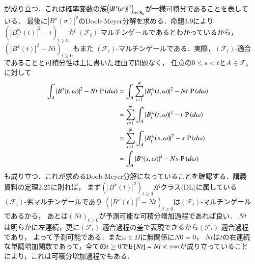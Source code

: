 \begin{prf}
\begin{description}
\begin{align}
		\end{align}
		が成り立つ．これは確率変数の族$\left(|B^x(\sigma)|^2\right)_{\sigma \in \bf{S}_a}$が一様可積分であることを表している．
		最後に$|B^x(\sigma)|^2$のDoob-Meyer分解を求める．命題3.9により$\left(|B_i^{x_i}(t)|^2 - t\right)_{t \geq 0}$が
		$(\mathcal{F}_t)$-マルチンゲールであるとわかっているから，$\left(|B^x(t)|^2 - Nt\right)_{t \geq 0}$もまた
		$(\mathcal{F}_t)$-マルチンゲールである．実際，$(\mathcal{F}_t)$-適合であることと可積分性は上に書いた理由で問題なく，
		任意の$0 \leq s < t$と$A \in \mathcal{F}_s$に対して
		\begin{align}
			\int_{A} |B^x(t, \omega)|^2 - Nt\, \operatorname{P} \left(d\omega\right) 
			&= \int_{A} \sum_{i=1}^{N} |B_i^{x_i}(t,\omega)|^2 - Nt\, \operatorname{P} \left(d\omega\right) \\
			&= \sum_{i=1}^{N} \int_{A} |B_i^{x_i}(t,\omega)|^2 - t\, \operatorname{P} \left(d\omega\right) \\
			&= \sum_{i=1}^{N} \int_{A} |B_i^{x_i}(s,\omega)|^2 - s\, \operatorname{P} \left(d\omega\right) \\
			&= \int_{A} |B^x(s, \omega)|^2 - Ns\, \operatorname{P} \left(d\omega\right) 
		\end{align}
		も成り立つ．これが求めるDoob-Meyer分解になっていることを確認する．講義資料の定理2.25に則れば，
		まず$\left(|B^x(t)|^2\right)_{t \geq 0}$がクラス(DL)に属している$(\mathcal{F}_t)$-劣マルチンゲールであり
		$\left(|B^x(t)|^2 - Nt\right)_{t \geq 0}$は$(\mathcal{F}_t)$-マルチンゲールであるから，
		あとは$(Nt)_{t \geq 0}$が予測可能な可積分増加過程であれば良い．
		$Nt$は明らかに左連続，更に$(\mathcal{F}_t)$-適合過程の差で表現できるから$(\mathcal{F}_t)$-適合過程であり，
		よって予測可能である．また$\omega \in \Omega$に無関係に$N 0 = 0$，
		$Nt$は$t$の右連続な単調増加関数であって，全ての$t \geq 0$で$\operatorname{E} \left[ Nt \right] = Nt < +\infty$が成り立っていることにより，これは可積分増加過程でもある．
		\QED
	

\end{description}
\end{prf}
